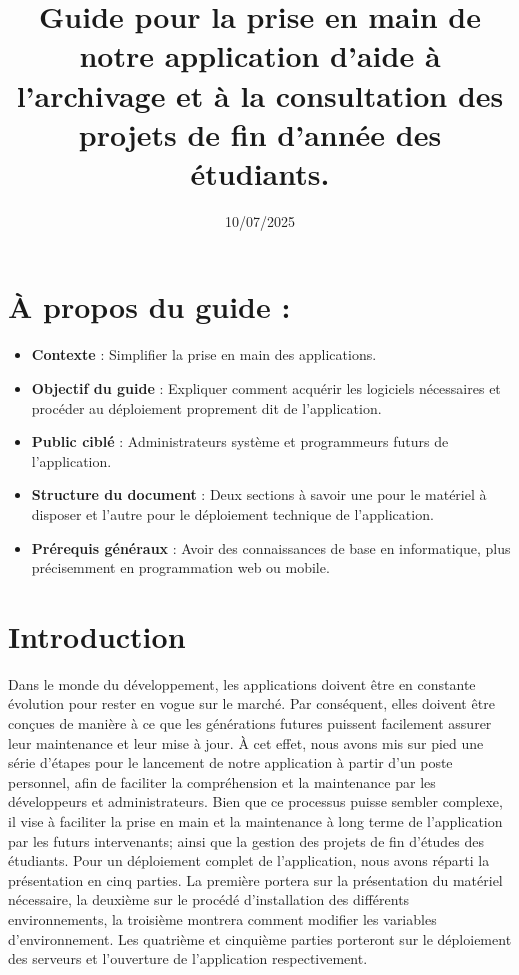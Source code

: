 \documentclass[12pt]{article}
\title{Guide pour la prise en main de notre application d’aide à l’archivage et à la consultation des projets de fin d'année des étudiants.}
\date{10/07/2025}
\begin{document}
\maketitle
\clearpage

\tableofcontents
\clearpage

\listoffigures
\clearpage


\section*{À propos du guide :}

\begin{itemize}[label=--]
    \item \textbf{Contexte} : Simplifier la prise en main des applications.
    \item \textbf{Objectif du guide} : Expliquer comment acquérir les logiciels nécessaires et procéder au déploiement proprement dit de l'application.
    \item \textbf{Public ciblé} : Administrateurs système et programmeurs futurs de l'application.
    \item \textbf{Structure du document} : Deux sections à savoir une pour le matériel à disposer et l'autre pour le déploiement technique de l'application.
    \item \textbf{Prérequis généraux} : Avoir des connaissances de base en informatique, plus précisemment en programmation web ou mobile.
\end{itemize}


\vfill

\newpage

{\fontsize{14}{16}\section*{Introduction}}
Dans le monde du développement, les applications doivent être en constante évolution pour rester en vogue sur le marché. Par conséquent, elles doivent être conçues de manière à ce que les générations futures puissent
facilement assurer leur maintenance et leur mise à jour. À cet effet, nous avons mis sur pied une série d'étapes pour le lancement de notre application
à partir d’un poste personnel, afin de faciliter la compréhension et la maintenance par les
développeurs et administrateurs. Bien que ce processus puisse sembler complexe, il vise à faciliter la prise en main et la
maintenance à long terme de l’application par les futurs intervenants; ainsi que la gestion
des projets de fin d'études des étudiants. Pour un déploiement complet de l'application, nous avons réparti la présentation en cinq
parties. La première portera sur la présentation du matériel nécessaire, la deuxième sur le procédé d'installation des différents environnements, la troisième montrera comment modifier les variables d'environnement. Les quatrième et cinquième parties porteront sur le déploiement des serveurs et l'ouverture de l'application respectivement.
\end{document}
